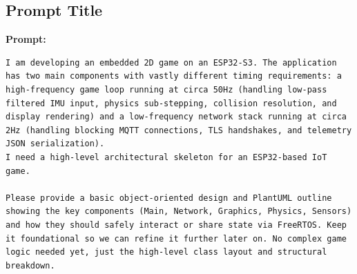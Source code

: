 \subsection{Prompt Title}

\textbf{Prompt:}
\begin{lstlisting}[language={}, breaklines=true]
I am developing an embedded 2D game on an ESP32-S3. The application has two main components with vastly different timing requirements: a high-frequency game loop running at circa 50Hz (handling low-pass filtered IMU input, physics sub-stepping, collision resolution, and display rendering) and a low-frequency network stack running at circa 2Hz (handling blocking MQTT connections, TLS handshakes, and telemetry JSON serialization).
I need a high-level architectural skeleton for an ESP32-based IoT game.

Please provide a basic object-oriented design and PlantUML outline showing the key components (Main, Network, Graphics, Physics, Sensors) and how they should safely interact or share state via FreeRTOS. Keep it foundational so we can refine it further later on. No complex game logic needed yet, just the high-level class layout and structural breakdown.
\end{lstlisting}


